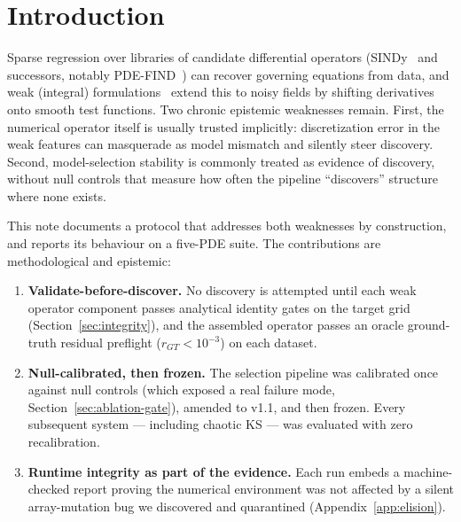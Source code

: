 \documentclass[11pt]{article}
\begin{document}
\section{Introduction}
Sparse regression over libraries of candidate differential operators
(SINDy~\cite{brunton2016} and successors, notably
PDE-FIND~\cite{rudy2017}) can recover governing equations from data, and
weak (integral) formulations~\cite{schaeffer2017,reinbold2020,messenger2021ode,messenger2021pde}
extend this to noisy fields by shifting derivatives onto smooth test
functions. Two chronic epistemic weaknesses remain. First,
the numerical operator itself is usually trusted implicitly: discretization
error in the weak features can masquerade as model mismatch and silently
steer discovery. Second, model-selection stability is commonly treated as
evidence of discovery, without null controls that measure how often the
pipeline ``discovers'' structure where none exists.

This note documents a protocol that addresses both weaknesses by
construction, and reports its behaviour on a five-PDE suite. The
contributions are methodological and epistemic:
\begin{enumerate}
\item \textbf{Validate-before-discover.} No discovery is attempted until
each weak operator component passes analytical identity gates on the target
grid (Section~\ref{sec:integrity}), and the assembled operator passes an
oracle ground-truth residual preflight ($r_{GT} < 10^{-3}$) on each dataset.
\item \textbf{Null-calibrated, then frozen.} The selection pipeline was
calibrated once against null controls (which exposed a real failure mode,
Section~\ref{sec:ablation-gate}), amended to v1.1, and then frozen. Every
subsequent system --- including chaotic KS --- was evaluated with zero
recalibration.
\item \textbf{Runtime integrity as part of the evidence.} Each run embeds a
machine-checked report proving the numerical environment was not affected by
a silent array-mutation bug we discovered and quarantined
(Appendix~\ref{app:elision}).
\end{enumerate}
\end{document}
